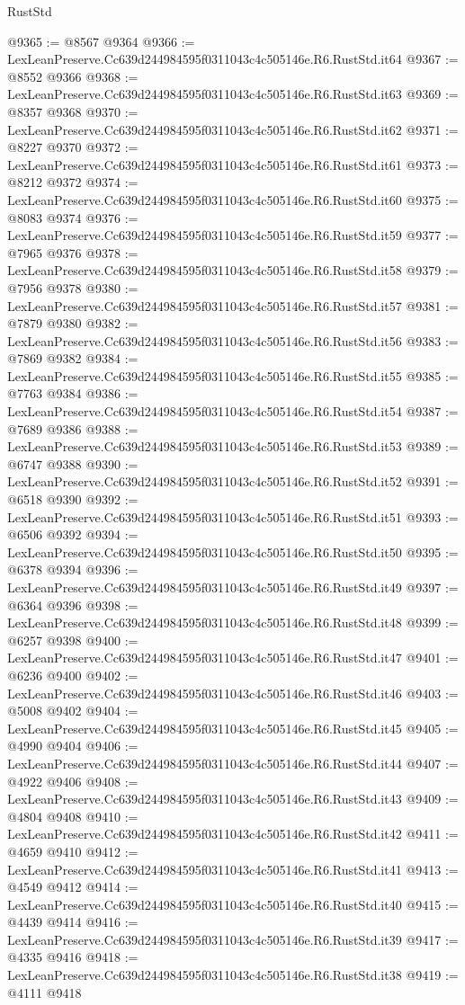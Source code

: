 \begin{lexlean}{RustStd}
\begin{coremodule}
@9365 := @8567 @9364
@9366 := LexLeanPreserve.Cc639d244984595f0311043c4c505146e.R6.RustStd.it64
@9367 := @8552 @9366
@9368 := LexLeanPreserve.Cc639d244984595f0311043c4c505146e.R6.RustStd.it63
@9369 := @8357 @9368
@9370 := LexLeanPreserve.Cc639d244984595f0311043c4c505146e.R6.RustStd.it62
@9371 := @8227 @9370
@9372 := LexLeanPreserve.Cc639d244984595f0311043c4c505146e.R6.RustStd.it61
@9373 := @8212 @9372
@9374 := LexLeanPreserve.Cc639d244984595f0311043c4c505146e.R6.RustStd.it60
@9375 := @8083 @9374
@9376 := LexLeanPreserve.Cc639d244984595f0311043c4c505146e.R6.RustStd.it59
@9377 := @7965 @9376
@9378 := LexLeanPreserve.Cc639d244984595f0311043c4c505146e.R6.RustStd.it58
@9379 := @7956 @9378
@9380 := LexLeanPreserve.Cc639d244984595f0311043c4c505146e.R6.RustStd.it57
@9381 := @7879 @9380
@9382 := LexLeanPreserve.Cc639d244984595f0311043c4c505146e.R6.RustStd.it56
@9383 := @7869 @9382
@9384 := LexLeanPreserve.Cc639d244984595f0311043c4c505146e.R6.RustStd.it55
@9385 := @7763 @9384
@9386 := LexLeanPreserve.Cc639d244984595f0311043c4c505146e.R6.RustStd.it54
@9387 := @7689 @9386
@9388 := LexLeanPreserve.Cc639d244984595f0311043c4c505146e.R6.RustStd.it53
@9389 := @6747 @9388
@9390 := LexLeanPreserve.Cc639d244984595f0311043c4c505146e.R6.RustStd.it52
@9391 := @6518 @9390
@9392 := LexLeanPreserve.Cc639d244984595f0311043c4c505146e.R6.RustStd.it51
@9393 := @6506 @9392
@9394 := LexLeanPreserve.Cc639d244984595f0311043c4c505146e.R6.RustStd.it50
@9395 := @6378 @9394
@9396 := LexLeanPreserve.Cc639d244984595f0311043c4c505146e.R6.RustStd.it49
@9397 := @6364 @9396
@9398 := LexLeanPreserve.Cc639d244984595f0311043c4c505146e.R6.RustStd.it48
@9399 := @6257 @9398
@9400 := LexLeanPreserve.Cc639d244984595f0311043c4c505146e.R6.RustStd.it47
@9401 := @6236 @9400
@9402 := LexLeanPreserve.Cc639d244984595f0311043c4c505146e.R6.RustStd.it46
@9403 := @5008 @9402
@9404 := LexLeanPreserve.Cc639d244984595f0311043c4c505146e.R6.RustStd.it45
@9405 := @4990 @9404
@9406 := LexLeanPreserve.Cc639d244984595f0311043c4c505146e.R6.RustStd.it44
@9407 := @4922 @9406
@9408 := LexLeanPreserve.Cc639d244984595f0311043c4c505146e.R6.RustStd.it43
@9409 := @4804 @9408
@9410 := LexLeanPreserve.Cc639d244984595f0311043c4c505146e.R6.RustStd.it42
@9411 := @4659 @9410
@9412 := LexLeanPreserve.Cc639d244984595f0311043c4c505146e.R6.RustStd.it41
@9413 := @4549 @9412
@9414 := LexLeanPreserve.Cc639d244984595f0311043c4c505146e.R6.RustStd.it40
@9415 := @4439 @9414
@9416 := LexLeanPreserve.Cc639d244984595f0311043c4c505146e.R6.RustStd.it39
@9417 := @4335 @9416
@9418 := LexLeanPreserve.Cc639d244984595f0311043c4c505146e.R6.RustStd.it38
@9419 := @4111 @9418

\end{coremodule}
\end{lexlean}
